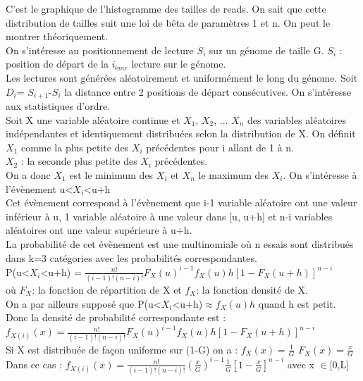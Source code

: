 \documentclass{book}
\begin{document}
C'est le graphique de l'histogramme des tailles de reads.
On sait que cette distribution de tailles suit une loi de bêta de paramètres 1 et n.
On peut le montrer théoriquement. \\
On s'intéresse au positionnement de lecture $S_{i}$ sur un génome de taille G. $S_{i}$ : position de départ de la $i_{ème}$ lecture sur le génome.\\
Les lectures sont générées aléatoirement et uniformément le long du génome.
Soit $D_{i}$= $S_{i+1}$-$S_{i}$ la distance entre 2 positions de départ consécutives.
On s'intéresse aux statistiques d'ordre.\\
Soit X une variable aléatoire continue et $X_{1}$, $X_{2}$, ... $X_{n}$ des variables aléatoires indépendantes et identiquement distribuées selon la distribution de X.
On définit $X_{1}$ comme la plus petite des $X_{i}$ précédentes pour i allant de 1 à n.\\
$X_{2}$ : la seconde plus petite des $X_{i}$ précédentes.\\
On a donc $X_{1}$ est le minimum des $X_{i}$ et $X_{n}$ le maximum des $X_{i}$.
On s'intéresse à l'évènement u<$X_{i}$<u+h\\
Cet évènement correspond à l'évènement que i-1 variable aléatoire ont une valeur inférieur à u, 1 variable aléatoire à une valeur dans [u, u+h] et n-i variables aléatoires ont une valeur supérieure à u+h.\\
La probabilité de cet évènement est une multinomiale où n essais sont distribués dans k=3 catégories avec les probabilités correspondantes.\\
P(u<$X_{i}$<u+h) = $\frac{n!}{(i-1)!(n-i)!} F_X(u)^{i-1}f_X(u)h[1-F_X(u+h)]^{n-i}$\\
où $F_X $: la fonction de répartition de X
et $f_X $: la fonction densité de X.\\
On a par ailleurs supposé que P(u<$X_{i}$<u+h)$\approx f_X(u)h$ quand h est petit.
Donc la densité de probabilité correspondante est :\\
$f_{X(i)}(x) = \frac{n!}{(i-1)!(n-i)!} F_X(u)^{i-1}f_X(u)h[1-F_X(u+h)]^{n-i}$\\
Si X est distribuée de façon uniforme sur (1-G) on a :
$f_X(x)=\frac{1}{G}$  $F_X(x)=\frac{x}{G}$\\
Dans ce cas : 
$f_{X(i)}(x) = \frac{n!}{(i-1)!(n-i)!} (\frac{x}{G})^{i-1} \frac{1}{G} [1-\frac{x}{G}]^{n-i}$ avec x $ \in $[0,L]                                                                                                                                                                                                                                                                                                                                                                                                                                                                                                                                                                                                                                                       
\end{document}
